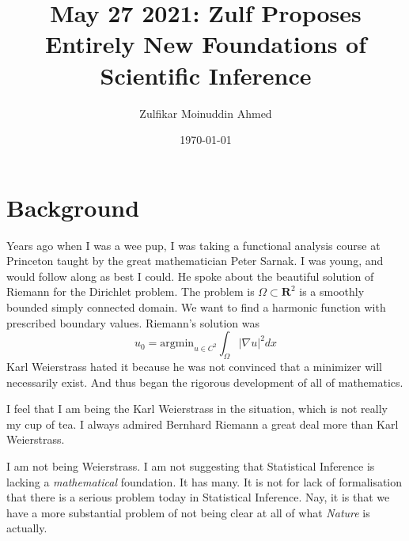 \documentclass{amsart}
\title{May 27 2021:  Zulf Proposes Entirely New Foundations of Scientific Inference}
\author{Zulfikar Moinuddin Ahmed}
\date{\today}
\begin{document}
\maketitle

\section{Background}

Years ago when I was a wee pup, I was taking a functional analysis course at Princeton taught by the great mathematician Peter Sarnak.  I was young, and would follow along as best I could.  He spoke about the beautiful solution of Riemann for the Dirichlet problem.  The problem is $\Omega \subset \mathbf{R}^2$ is a smoothly bounded simply connected domain.  We want to find a harmonic function with prescribed boundary values.  Riemann's solution was
\[
u_0 = \mathrm{argmin}_{u \in C^2} \int_{\Omega} | \nabla u |^2 dx
\]
Karl Weierstrass hated it because he was not convinced that a minimizer will necessarily exist.  And thus began the rigorous development of all of mathematics.

I feel that I am being the Karl Weierstrass in the situation, which is not really my cup of tea.  I always admired Bernhard Riemann a great deal more than Karl Weierstrass.  

I am not being Weierstrass.  I am not suggesting that Statistical Inference is lacking a {\em mathematical} foundation.  It has many.  It is not for lack of formalisation that there is a serious problem today in Statistical Inference.  Nay, it is that we have a more substantial problem of not being clear at all of what {\em Nature} is actually.
\end{document}
